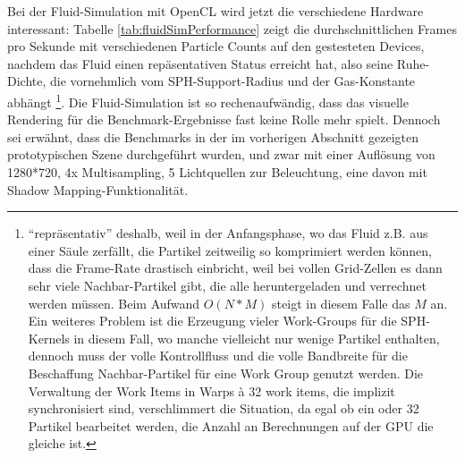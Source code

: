 	Bei der Fluid-Simulation mit OpenCL wird jetzt die verschiedene Hardware interessant:
	Tabelle \ref{tab:fluidSimPerformance} zeigt die durchschnittlichen Frames pro Sekunde
	mit verschiedenen Particle Counts auf den gestesteten Devices, nachdem das Fluid einen repäsentativen
	Status erreicht hat, also seine Ruhe-Dichte, die vornehmlich vom SPH-Support-Radius und der Gas-Konstante abhängt
	\footnote{"`repräsentativ"' deshalb, weil in der Anfangsphase, wo das Fluid z.B. aus einer Säule zerfällt, die Partikel
	zeitweilig so komprimiert werden können, dass die Frame-Rate drastisch einbricht, weil bei vollen Grid-Zellen
	es dann sehr viele Nachbar-Partikel gibt, die alle heruntergeladen und verrechnet werden müssen.
	Beim Aufwand $O(N*M)$ steigt in diesem Falle das $M$ an. Ein weiteres Problem ist die Erzeugung vieler Work-Groups
	für die SPH-Kernels in diesem Fall, wo manche vielleicht nur wenige Partikel enthalten, 
	dennoch muss der volle Kontrollfluss und die volle Bandbreite für die Beschaffung Nachbar-Partikel für eine Work Group 
	genutzt werden. Die Verwaltung der Work Items in Warps à 32 work items, die implizit synchronisiert sind, verschlimmert 	die Situation, da egal ob ein oder 32 Partikel bearbeitet werden, die Anzahl an Berechnungen auf der GPU die gleiche 
	ist.}.
	Die Fluid-Simulation ist so rechenaufwändig, dass das visuelle Rendering für die Benchmark-Ergebnisse fast keine 
	Rolle mehr spielt. Dennoch sei erwähnt, dass die Benchmarks in der im vorherigen Abschnitt gezeigten prototypischen
	Szene durchgeführt wurden, und zwar mit einer Auflösung von 1280*720, 4x Multisampling, 5 Lichtquellen zur Beleuchtung,
	eine davon mit Shadow Mapping-Funktionalität.
	
